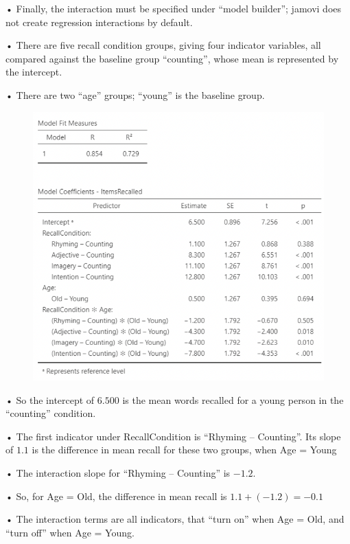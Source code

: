 \documentclass[
  letterpaper,
  DIV=11,
  numbers=noendperiod]{scrreprt}
\begin{document}
• Finally, the interaction must be specified under ``model builder'';
jamovi does not create regression interactions by default.

• There are five recall condition groups, giving four indicator
variables, all compared against the baseline group ``counting'', whose
mean is represented by the intercept.

• There are two ``age'' groups; ``young'' is the baseline group.

\begin{figure}

\includegraphics[width=5.3125in,height=\textheight]{images/Mod5_13.png} \hfill{}

\end{figure}

• So the intercept of \(6.500\) is the mean words recalled for a young
person in the ``counting'' condition.

• The first indicator under RecallCondition is ``Rhyming -- Counting''.
Its slope of \(1.1\) is the difference in mean recall for these two
groups, when Age = Young

• The interaction slope for ``Rhyming -- Counting'' is \(-1.2\).

• So, for Age = Old, the difference in mean recall is
\(1.1 +(-1.2) = −0.1\)

• The interaction terms are all indicators, that ``turn on'' when Age =
Old, and ``turn off'' when Age = Young.
\end{document}

